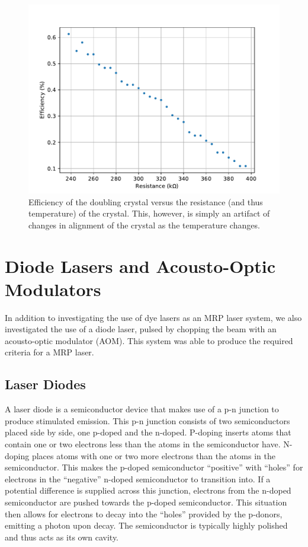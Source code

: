 \begin{figure}[h!]
  \centering
  \includegraphics[width = .8\textwidth]{Images/efficiency.pdf}
  \caption{Efficiency of the doubling crystal versus the resistance (and thus temperature) of the crystal. This, however, is simply an artifact of changes in alignment of the crystal as the temperature changes.}
  \label{fig:crystaleff}
\end{figure}






\section{Diode Lasers and Acousto-Optic Modulators}

In addition to investigating the use of dye lasers as an MRP laser system, we also investigated the use of a diode laser, pulsed by chopping the beam with an acousto-optic modulator (AOM). This system was able to produce the required criteria for a MRP laser.

\subsection{Laser Diodes}
A laser diode is a semiconductor device that makes use of a p-n junction to produce stimulated emission. This p-n junction consists of two semiconductors placed side by side, one p-doped and the n-doped. P-doping inserts atoms that contain one or two electrons less than the atoms in the semiconductor have. N-doping places atoms with one or two more electrons than the atoms in the semiconductor. This makes the p-doped semiconductor ``positive'' with ``holes'' for electrons in the ``negative'' n-doped semiconductor to transition into. If a potential difference is supplied across this junction, electrons from the n-doped semiconductor are pushed towards the p-doped semiconductor. This situation then allows for electrons to decay into the ``holes'' provided by the p-donors, emitting a photon upon decay. The semiconductor is typically highly polished and thus acts as its own cavity.


